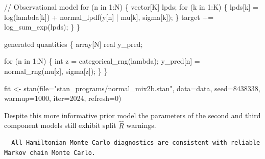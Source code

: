 \documentclass[
  letterpaper,
  DIV=11,
  numbers=noendperiod]{scrartcl}
\newenvironment{Shaded}{\begin{snugshade}}{\end{snugshade}}
\newcommand{\AttributeTok}[1]{\textcolor[rgb]{0.40,0.45,0.13}{#1}}
\newcommand{\CommentTok}[1]{\textcolor[rgb]{0.37,0.37,0.37}{#1}}
\newcommand{\ControlFlowTok}[1]{\textcolor[rgb]{0.00,0.23,0.31}{#1}}
\newcommand{\DataTypeTok}[1]{\textcolor[rgb]{0.68,0.00,0.00}{#1}}
\newcommand{\DecValTok}[1]{\textcolor[rgb]{0.68,0.00,0.00}{#1}}
\newcommand{\FunctionTok}[1]{\textcolor[rgb]{0.28,0.35,0.67}{#1}}
\newcommand{\KeywordTok}[1]{\textcolor[rgb]{0.00,0.23,0.31}{#1}}
\newcommand{\NormalTok}[1]{\textcolor[rgb]{0.00,0.23,0.31}{#1}}
\newcommand{\OtherTok}[1]{\textcolor[rgb]{0.00,0.23,0.31}{#1}}
\newcommand{\SpecialCharTok}[1]{\textcolor[rgb]{0.37,0.37,0.37}{#1}}
\newcommand{\StringTok}[1]{\textcolor[rgb]{0.13,0.47,0.30}{#1}}
\begin{document}
\begin{codelisting}
\begin{Shaded}
\begin{Highlighting}[]
  \CommentTok{// Observational model}
  \ControlFlowTok{for}\NormalTok{ (n }\ControlFlowTok{in} \DecValTok{1}\NormalTok{:N) \{}
    \DataTypeTok{vector}\NormalTok{[K] lpds;}
    \ControlFlowTok{for}\NormalTok{ (k }\ControlFlowTok{in} \DecValTok{1}\NormalTok{:K) \{}
\NormalTok{      lpds[k] = log(lambda[k]) + normal\_lpdf(y[n] | mu[k], sigma[k]);}
\NormalTok{    \}}
    \KeywordTok{target +=}\NormalTok{ log\_sum\_exp(lpds);}
\NormalTok{  \}}
\NormalTok{\}}

\KeywordTok{generated quantities}\NormalTok{ \{}
  \DataTypeTok{array}\NormalTok{[N] }\DataTypeTok{real}\NormalTok{ y\_pred;}

  \ControlFlowTok{for}\NormalTok{ (n }\ControlFlowTok{in} \DecValTok{1}\NormalTok{:N) \{}
    \DataTypeTok{int}\NormalTok{ z = categorical\_rng(lambda);}
\NormalTok{    y\_pred[n] = normal\_rng(mu[z], sigma[z]);}
\NormalTok{  \}}
\NormalTok{\}}
\end{Highlighting}
\end{Shaded}

\end{codelisting}

\begin{Shaded}
\begin{Highlighting}[]
\NormalTok{fit }\OtherTok{\textless{}{-}} \FunctionTok{stan}\NormalTok{(}\AttributeTok{file=}\StringTok{"stan\_programs/normal\_mix2b.stan"}\NormalTok{,}
            \AttributeTok{data=}\NormalTok{data, }\AttributeTok{seed=}\DecValTok{8438338}\NormalTok{,}
            \AttributeTok{warmup=}\DecValTok{1000}\NormalTok{, }\AttributeTok{iter=}\DecValTok{2024}\NormalTok{, }\AttributeTok{refresh=}\DecValTok{0}\NormalTok{)}
\end{Highlighting}
\end{Shaded}

Despite this more informative prior model the parameters of the second
and third component models still exhibit split \(\hat{R}\) warnings.

\begin{Shaded}
\end{Shaded}

\begin{verbatim}
  All Hamiltonian Monte Carlo diagnostics are consistent with reliable
Markov chain Monte Carlo.
\end{verbatim}
\end{document}
